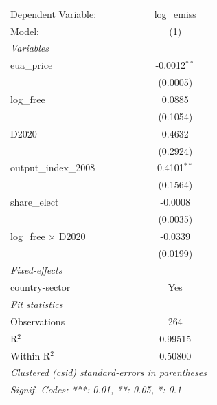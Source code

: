 
\begingroup
\centering
\begin{tabular}{lc}
   \tabularnewline \midrule \midrule
   Dependent Variable:        & log\_emiss\\   
   Model:                     & (1)\\  
   \midrule
   \emph{Variables}\\
   eua\_price                 & -0.0012$^{**}$\\   
                              & (0.0005)\\   
   log\_free                  & 0.0885\\   
                              & (0.1054)\\   
   D2020                      & 0.4632\\   
                              & (0.2924)\\   
   output\_index\_2008        & 0.4101$^{**}$\\   
                              & (0.1564)\\   
   share\_elect               & -0.0008\\   
                              & (0.0035)\\   
   log\_free $\times$ D2020   & -0.0339\\   
                              & (0.0199)\\   
   \midrule
   \emph{Fixed-effects}\\
   country-sector             & Yes\\  
   \midrule
   \emph{Fit statistics}\\
   Observations               & 264\\  
   R$^2$                      & 0.99515\\  
   Within R$^2$               & 0.50800\\  
   \midrule \midrule
   \multicolumn{2}{l}{\emph{Clustered (csid) standard-errors in parentheses}}\\
   \multicolumn{2}{l}{\emph{Signif. Codes: ***: 0.01, **: 0.05, *: 0.1}}\\
\end{tabular}
\par\endgroup


